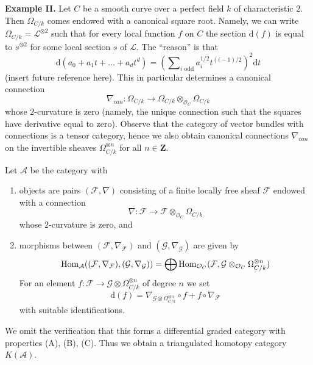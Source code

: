 \medskip\noindent
{\bf Example II.} Let $C$ be a smooth curve over a perfect field $k$ of
characteristic $2$. Then $\Omega_{C/k}$ comes endowed with a canonical
square root. Namely, we can write $\Omega_{C/k} = \mathcal{L}^{\otimes 2}$
such that for every local function $f$ on $C$ the section
$\text{d}(f)$ is equal to $s^{\otimes 2}$ for some local section
$s$ of $\mathcal{L}$. The ``reason'' is that
$$
\text{d}(a_0 + a_1t + \ldots +a_dt^d) =
(\sum\nolimits_{i\text{ odd}} a_i^{1/2} t^{(i - 1)/2})^2\text{d}t
$$
(insert future reference here). This in particular determines a
canonical connection
$$
\nabla_{can} :
\Omega_{C/k}
\longrightarrow
\Omega_{C/k} \otimes_{\mathcal{O}_C} \Omega_{C/k}
$$
whose $2$-curvature is zero (namely, the unique connection such that the
squares have derivative equal to zero).
Observe that the category of vector bundles
with connections is a tensor category, hence we also obtain canonical
connections $\nabla_{can}$ on the invertible sheaves
$\Omega_{C/k}^{\otimes n}$ for all $n \in \mathbf{Z}$.

\medskip\noindent
Let $\mathcal{A}$ be the category with
\begin{enumerate}
\item objects are pairs $(\mathcal{F}, \nabla)$ consisting of a
finite locally free sheaf $\mathcal{F}$ endowed with a connection
$$
\nabla :
\mathcal{F}
\longrightarrow
\mathcal{F} \otimes_{\mathcal{O}_C} \Omega_{C/k}
$$
whose $2$-curvature is zero, and
\item morphisms between $(\mathcal{F}, \nabla_\mathcal{F})$ and
$(\mathcal{G}, \nabla_\mathcal{G})$
are given by
$$
\mathop{\mathrm{Hom}}\nolimits_\mathcal{A}((\mathcal{F}, \nabla_\mathcal{F}),
(\mathcal{G}, \nabla_\mathcal{G})) =
\bigoplus \mathop{\mathrm{Hom}}\nolimits_{\mathcal{O}_C}(\mathcal{F},
\mathcal{G} \otimes_{\mathcal{O}_C} \Omega_{C/k}^{\otimes n})
$$
For an element
$f : \mathcal{F} \to \mathcal{G} \otimes \Omega_{C/k}^{\otimes n}$
of degree $n$ we set
$$
\text{d}(f) =
\nabla_{\mathcal{G} \otimes \Omega_{C/k}^{\otimes n}} \circ f +
f \circ \nabla_\mathcal{F}
$$
with suitable identifications.
\end{enumerate}
We omit the verification that this forms a differential graded
category with properties (A), (B), (C). Thus we obtain a triangulated
homotopy category $K(\mathcal{A})$.

